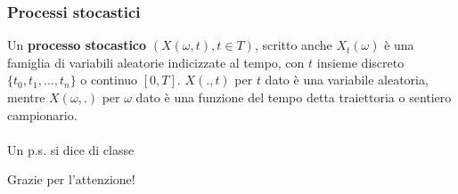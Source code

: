 \documentclass{beamer}
\begin{document}
\begin{frame}
\frametitle{Processi stocastici}
		Un \textbf{processo stocastico }$(X(\omega,t), t \in T)$, scritto anche $X_t(\omega) $ è una famiglia di variabili aleatorie indicizzate al tempo, con $t$ insieme discreto $\{t_0, t_1,..., t_n\}$ o continuo $[0,T]$. $X(.,t)$ per $t$ dato è una variabile aleatoria, mentre $X(\omega,.)$ per $\omega$ dato è una funzione del tempo detta traiettoria o sentiero campionario.
			\\~\\
	Un p.s. si dice di classe
\end{frame}
\begin{frame}
	\Huge{\centerline{Grazie per l'attenzione!}}
\end{frame}
\end{document}
